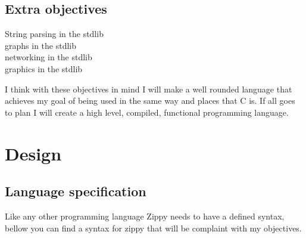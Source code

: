 \documentclass[a4paper,12pt]{article}
\begin{document}
{\subsection{Extra objectives}
\begin{description}
	\item[String parsing in the stdlib]
	\item[graphs in the stdlib]
	\item[networking in the stdlib]
	\item[graphics in the stdlib]
\end{description}

I think with these objectives in mind I will make a well rounded language that achieves my
goal of being used in the same way and places that C is. If all goes to plan I will 
create a high level, compiled, functional programming language.

\section{Design}
\subsection{Language specification}
Like any other programming language Zippy needs to have a defined syntax, bellow
you can find a syntax for zippy that will be complaint with my objectives.
}
\end{document}
